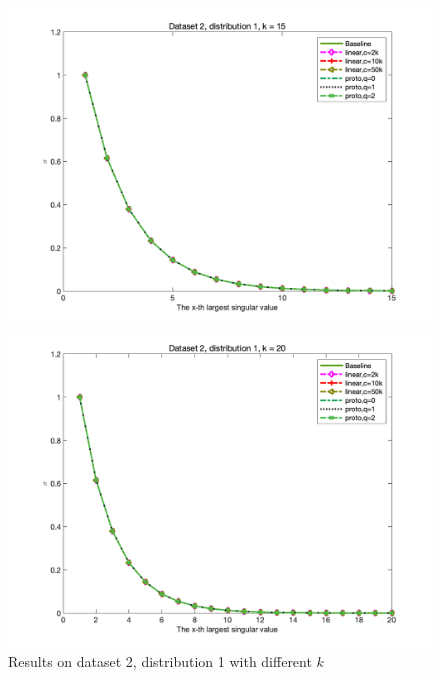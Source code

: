 \documentclass{article}
\begin{document}
\begin{figure}[p]
\begin{minipage}{0.54\linewidth}
		\includegraphics[width=1\linewidth]{./fig/dataset2_k15_t1.png}
		\caption{$k=15$}
	\end{minipage}
	\begin{minipage}{0.54\linewidth}
		\centering
		\includegraphics[width=1\linewidth]{./fig/dataset2_k20_t1.png}
		\caption{$k=20$}
	\end{minipage}
	\caption*{Results on dataset 2, distribution 1 with different $k$}
\end{figure} 
\end{document}
